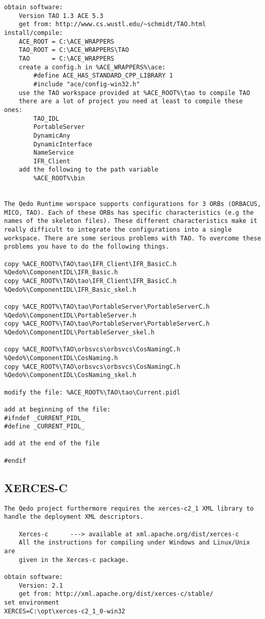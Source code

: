 \documentclass[12pt,a4paper]{report}
\begin{document}
\begin{verbatim}
obtain software:
	Version TAO 1.3 ACE 5.3
	get from: http://www.cs.wustl.edu/~schmidt/TAO.html
install/compile:
	ACE_ROOT = C:\ACE_WRAPPERS
	TAO_ROOT = C:\ACE_WRAPPERS\TAO
	TAO      = C:\ACE_WRAPPERS
	create a config.h in %ACE_WRAPPERS%\ace:
		#define ACE_HAS_STANDARD_CPP_LIBRARY 1
		#include "ace/config-win32.h"
	use the TAO workspace provided at %ACE_ROOT%\tao to compile TAO
	there are a lot of project you need at least to compile these ones:
		TAO_IDL
		PortableServer
		DynamicAny
		DynamicInterface
		NameService
		IFR_Client
	add the following to the path variable
		%ACE_ROOT%\bin
		

The Qedo Runtime worspace supports configurations for 3 ORBs (ORBACUS, MICO, TAO). Each of these ORBs has specific characteristics (e.g the names of the skeleton files). These different characteristics make it really difficult to integrate the configurations into a single workspace. There are some serious problems with TAO. To overcome these problems you have to do the following things.

copy %ACE_ROOT%\TAO\tao\IFR_Client\IFR_BasicC.h  %Qedo%\ComponentIDL\IFR_Basic.h
copy %ACE_ROOT%\TAO\tao\IFR_Client\IFR_BasicC.h  %Qedo%\ComponentIDL\IFR_Basic_skel.h

copy %ACE_ROOT%\TAO\tao\PortableServer\PortableServerC.h  %Qedo%\ComponentIDL\PortableServer.h
copy %ACE_ROOT%\TAO\tao\PortableServer\PortableServerC.h  %Qedo%\ComponentIDL\PortableServer_skel.h

copy %ACE_ROOT%\TAO\orbsvcs\orbsvcs\CosNamingC.h  %Qedo%\ComponentIDL\CosNaming.h
copy %ACE_ROOT%\TAO\orbsvcs\orbsvcs\CosNamingC.h  %Qedo%\ComponentIDL\CosNaming_skel.h

modify the file: %ACE_ROOT%\TAO\tao\Current.pidl

add at beginning of the file:
#ifndef _CURRENT_PIDL_
#define _CURRENT_PIDL_

add at the end of the file

#endif

\end{verbatim}


\subsection{XERCES-C}
\label{sec:XERCESC}

\begin{verbatim}
The Qedo project furthermore requires the xerces-c2_1 XML library to
handle the deployment XML descriptors.

	Xerces-c      ---> available at xml.apache.org/dist/xerces-c
	All the instructions for compiling under Windows and Linux/Unix are
	given in the Xerces-c package.
	
obtain software:
	Version: 2.1
	get from: http://xml.apache.org/dist/xerces-c/stable/
set environment
XERCES=C:\opt\xerces-c2_1_0-win32


\end{verbatim}
\end{document}
